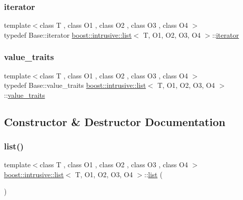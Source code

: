 \subsubsection{\texorpdfstring{iterator}{iterator}}
{\footnotesize\ttfamily template$<$class T , class O1 , class O2 , class O3 , class O4 $>$ \\
typedef Base\+::iterator \hyperlink{classboost_1_1intrusive_1_1list}{boost\+::intrusive\+::list}$<$ T, O1, O2, O3, O4 $>$\+::\hyperlink{classboost_1_1intrusive_1_1list_a3b53513ff4e214951fc767223097fb6e}{iterator}}

\mbox{\label{classboost_1_1intrusive_1_1list_aed9db2882c7567d4600fce5dda67c0ab}} 
\subsubsection{\texorpdfstring{value\+\_\+traits}{value\_traits}}
{\footnotesize\ttfamily template$<$class T , class O1 , class O2 , class O3 , class O4 $>$ \\
typedef Base\+::value\+\_\+traits \hyperlink{classboost_1_1intrusive_1_1list}{boost\+::intrusive\+::list}$<$ T, O1, O2, O3, O4 $>$\+::\hyperlink{classboost_1_1intrusive_1_1list_aed9db2882c7567d4600fce5dda67c0ab}{value\+\_\+traits}}



\subsection{Constructor \& Destructor Documentation}
\mbox{\label{classboost_1_1intrusive_1_1list_acf7cd5a0ce708aa2a2e43a677383ce3d}} 
\subsubsection{\texorpdfstring{list()}{list()}\hspace{0.1cm}{\footnotesize\ttfamily [1/4]}}
{\footnotesize\ttfamily template$<$class T , class O1 , class O2 , class O3 , class O4 $>$ \\
\hyperlink{classboost_1_1intrusive_1_1list}{boost\+::intrusive\+::list}$<$ T, O1, O2, O3, O4 $>$\+::\hyperlink{classboost_1_1intrusive_1_1list}{list} (\begin{DoxyParamCaption}{ }\end{DoxyParamCaption})\hspace{0.3cm}{\ttfamily [inline]}}

